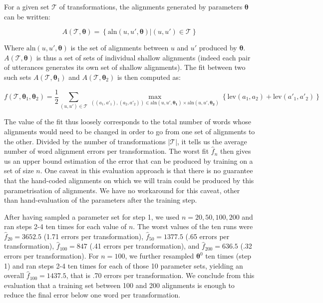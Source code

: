\documentclass[a4paper,fleqn]{cas-dc}
\begin{document}
For a given set \(\mathcal{T}\) of transformations, the alignments
generated by parameters \(\bm{\theta}\) can be written:

\[A\left(\mathcal{T}, \bm{\theta}\right) = \left\{ \text{aln}(u, u', \bm{\theta}) | (u, u') \in \mathcal{T} \right\}\]

Where \(\text{aln}(u, u', \bm{\theta})\) is the set of alignments
between \(u\) and \(u'\) produced by \(\bm{\theta}\).
\(A\left(\mathcal{T}, \bm{\theta}\right)\) is thus a set of sets of
individual shallow alignments (indeed each pair of utterances generates
its own set of shallow alignments). The fit between two such sets
\(A\left(\mathcal{T}, \bm{\theta}_1\right)\) and
\(A\left(\mathcal{T}, \bm{\theta}_2\right)\) is then computed as:

\[
f(\mathcal{T}, \bm{\theta}_1, \bm{\theta}_2) =
  \frac{1}{2}
  \sum_{(u, u') \in \mathcal{T}}
    \max_{((a_1, a'_1), (a_2, a'_2))
      \in \text{aln}(u, u', \bm{\theta_1}) \times \text{aln}(u, u', \bm{\theta_2})}
    \left\{
      \text{lev}(a_1, a_2) + \text{lev}(a'_1, a'_2)
    \right\}
\]

The value of the fit thus loosely corresponds to the total number of
words whose alignments would need to be changed in order to go from one
set of alignments to the other. Divided by the number of transformations
\(|\mathcal{T}|\), it tells us the average number of word alignment
errors per transformation. The worst fit \(\hat{f}_n\) then gives us an
upper bound estimation of the error that can be produced by training on
a set of size \(n\). One caveat in this evaluation approach is that
there is no guarantee that the hand-coded alignments on which we will
train could be produced by this parametrisation of alignments. We have
no workaround for this caveat, other than hand-evaluation of the
parameters after the training step.

After having sampled a parameter set for step 1, we used
\(n = 20, 50, 100, 200\) and ran steps 2-4 ten times for each value of
\(n\). The worst values of the ten runs were \(\hat{f}_{20} = 3652.5\)
(1.71 errors per transformation), \(\hat{f}_{50} = 1377.5\) (.65 errors
per transformation), \(\hat{f}_{100} = 847\) (.41 errors per
transformation), and \(\hat{f}_{200} = 636.5\) (.32 errors per
transformation). For \(n = 100\), we further resampled \(\bm{\theta}^0\)
ten times (step 1) and ran steps 2-4 ten times for each of those 10
parameter sets, yielding an overall \(\hat{f}_{100} = 1437.5\), that is
.70 errors per transformation. We conclude from this evaluation that a
training set between 100 and 200 alignments is enough to reduce the
final error below one word per transformation.
\end{document}
